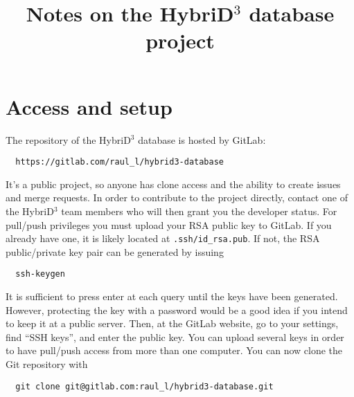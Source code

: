 \documentclass{article}
\title{Notes on the HybriD$^3$ database project}
\begin{document}
\maketitle

\tableofcontents

\section{Access and setup}

The repository of the HybriD$^3$ database is hosted by GitLab:
\lstset{language=Bash}
\begin{lstlisting}
  https://gitlab.com/raul_l/hybrid3-database
\end{lstlisting}
It's a public project, so anyone has clone access and the ability to create issues and merge requests. In order to contribute to the project directly, contact one of the HybriD$^3$ team members who will then grant you the developer status. For pull/push privileges you must upload your RSA public key to GitLab. If you already have one, it is likely located at \verb+.ssh/id_rsa.pub+. If not, the RSA public/private key pair can be generated by issuing
\begin{lstlisting}
  ssh-keygen
\end{lstlisting}
It is sufficient to press enter at each query until the keys have been generated. However, protecting the key with a password would be a good idea if you intend to keep it at a public server. Then, at the GitLab website, go to your settings, find ``SSH keys'', and enter the public key. You can upload several keys in order to have pull/push access from more than one computer. You can now clone the Git repository with
\begin{lstlisting}
  git clone git@gitlab.com:raul_l/hybrid3-database.git
\end{lstlisting}
\end{document}
